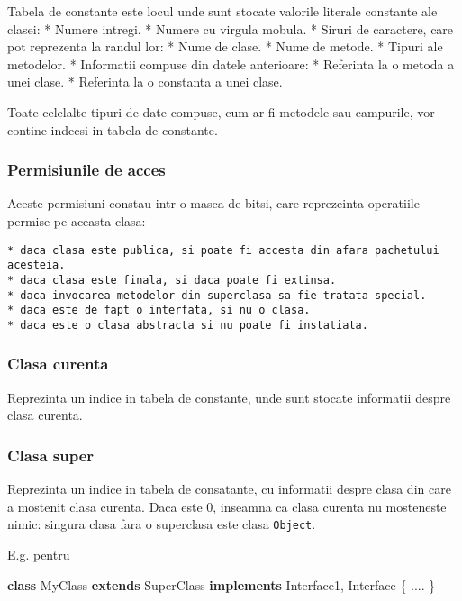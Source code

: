 \documentclass[]{article}
\newenvironment{Shaded}{}{}
\newcommand{\KeywordTok}[1]{\textcolor[rgb]{0.00,0.44,0.13}{\textbf{#1}}}
\newcommand{\NormalTok}[1]{#1}
\begin{document}
Tabela de constante este locul unde sunt stocate valorile literale
constante ale clasei: * Numere intregi. * Numere cu virgula mobula. *
Siruri de caractere, care pot reprezenta la randul lor: * Nume de clase.
* Nume de metode. * Tipuri ale metodelor. * Informatii compuse din
datele anterioare: * Referinta la o metoda a unei clase. * Referinta la
o constanta a unei clase.

Toate celelalte tipuri de date compuse, cum ar fi metodele sau
campurile, vor contine indecsi in tabela de constante.

\subsubsection{Permisiunile de acces}\label{permisiunile-de-acces}

Aceste permisiuni constau intr-o masca de bitsi, care reprezeinta
operatiile permise pe aceasta clasa:

\begin{verbatim}
* daca clasa este publica, si poate fi accesta din afara pachetului acesteia.
* daca clasa este finala, si daca poate fi extinsa.
* daca invocarea metodelor din superclasa sa fie tratata special.
* daca este de fapt o interfata, si nu o clasa.
* daca este o clasa abstracta si nu poate fi instatiata.
\end{verbatim}

\subsubsection{Clasa curenta}\label{clasa-curenta}

Reprezinta un indice in tabela de constante, unde sunt stocate
informatii despre clasa curenta.

\subsubsection{Clasa super}\label{clasa-super}

Reprezinta un indice in tabela de consatante, cu informatii despre clasa
din care a mostenit clasa curenta. Daca este 0, inseamna ca clasa
curenta nu mosteneste nimic: singura clasa fara o superclasa este clasa
\texttt{Object}.

E.g. pentru

\begin{Shaded}
	\begin{Highlighting}[]
		\KeywordTok{class}\NormalTok{ MyClass }\KeywordTok{extends}\NormalTok{ SuperClass }\KeywordTok{implements}\NormalTok{ Interface1, Interface \{}
		\NormalTok{    ....}
		\NormalTok{\}}
	\end{Highlighting}
\end{Shaded}
\end{document}

